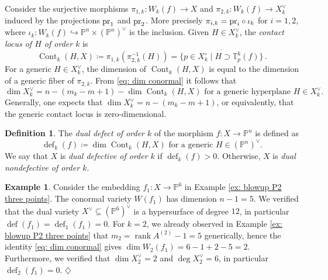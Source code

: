 \documentclass[11pt,reqno]{amsart}
\numberwithin{equation}{section}
\theoremstyle{plain}
\numberwithin{theorem}{section}
\theoremstyle{definition}
\newtheorem{definition}[theorem]{Definition}
\newtheorem{example}[theorem]{Example}
\renewcommand{\P}{\mathbb{P}}
\newcommand{\T}{\mathbb{T}}
\newcommand{\pr}{{\rm pr}}
\newcommand{\cont}{\operatorname{Cont}}
\newcommand{\defect}{\operatorname{def}}
\newcommand{\rank}{\operatorname{rank}}
\begin{document}
Consider the surjective morphisms $\pi_{1,k}\colon W_k(f)\to X$ and $\pi_{2,k}\colon W_k(f)\to X_k^\vee$ induced by the projections $\pr_1$ and $\pr_2$. More precisely $\pi_{i,k}=\pr_i\circ \iota_k$ for $i=1,2$, where $\iota_k\colon W_k(f)\hookrightarrow\P^n\times(\P^n)^\vee$ is the inclusion.
Given $H\in X_k^\vee$, the {\em contact locus of $H$ of order $k$} is
\begin{equation}\label{eq: def contact locus order k}
    \cont_k(H,X)\coloneqq\pi_{1,k}(\pi_{2,k}^{-1}(H))=\overline{\{p\in X_k^{\circ}\mid H\supset \T_p^k(f)\}}\,.
\end{equation}
For a generic $H\in X_k^\vee$, the dimension of $\cont_k(H,X)$
is equal to the dimension of a generic fiber of $\pi_{2,k}$. From \eqref{eq: dim conormal} it follows that 
\[
\text{$\dim X_k^\vee=n-(m_k-m+1)-\dim\cont_k(H,X)$ for a generic hyperplane $H\in X_k^\vee$.}
\]
Generally, one expects that $\dim X_k^\vee=n-(m_k-m+1)$, or equivalently, that the generic contact locus is zero-dimensional.

\begin{definition}\label{def: kth dual defect}
The {\em dual defect of order $k$} of the  morphism $f\colon X\to\P^n$ is defined as
\begin{equation}
\text{$\defect_k(f)\coloneqq\dim\cont_k(H,X)$ for a generic $H\in(\P^n)^\vee$.}    
\end{equation}
We say that $X$ is {\em dual defective of order $k$} if $\defect_k(f)>0$. Otherwise, $X$ is {\em dual nondefective of order $k$}.
\end{definition}

\begin{example}\label{ex: multidegrees blowup P2 three points}
Consider the embedding $f_1\colon X\to\P^6$ in Example \ref{ex: blowup P2 three points}. The conormal variety $W(f_1)$ has dimension $n-1=5$. We verified that the dual variety $X^\vee\subseteq(\P^6)^\vee$ is a hypersurface of degree $12$, in particular $\defect(f_1)=\defect_1(f_1)=0$. For $k=2$, we already observed in Example \ref{ex: blowup P2 three points} that $m_2=\rank A^{(2)}-1=5$ generically, hence the identity \eqref{eq: dim conormal} gives $\dim W_2(f_1)=6-1+2-5=2$. Furthermore, we verified that $\dim X_2^\vee=2$ and $\deg X_2^\vee=6$, in particular $\defect_2(f_1)=0.$ \hfill$\diamondsuit$
\end{example}
\end{document}
